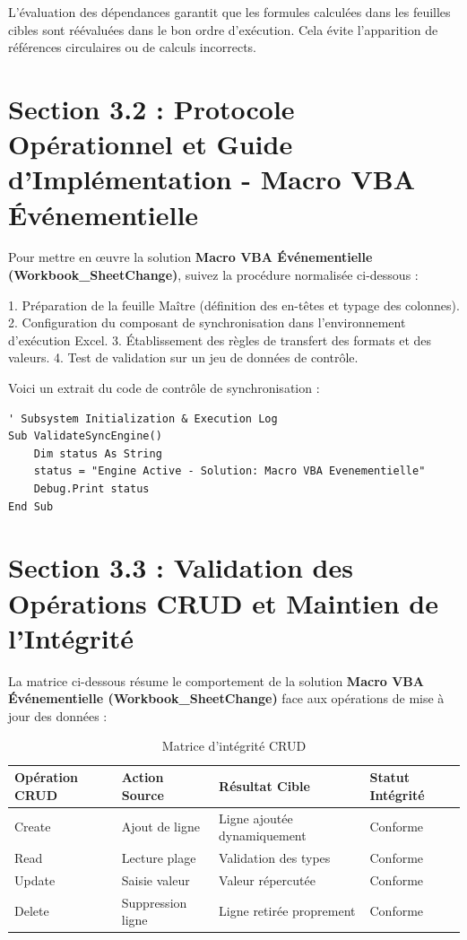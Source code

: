 \documentclass[12pt,a4paper]{report}
\begin{document}
L'évaluation des dépendances garantit que les formules calculées dans les feuilles cibles sont réévaluées dans le bon ordre d'exécution. Cela évite l'apparition de références circulaires ou de calculs incorrects.


\section{Section 3.2 : Protocole Opérationnel et Guide d'Implémentation - Macro VBA Événementielle}
Pour mettre en œuvre la solution \textbf{Macro VBA Événementielle (Workbook\_SheetChange)}, suivez la procédure normalisée ci-dessous :

1. Préparation de la feuille Maître (définition des en-têtes et typage des colonnes).
2. Configuration du composant de synchronisation dans l'environnement d'exécution Excel.
3. Établissement des règles de transfert des formats et des valeurs.
4. Test de validation sur un jeu de données de contrôle.

Voici un extrait du code de contrôle de synchronisation :
\begin{lstlisting}[caption=Code de controle operationnel]
' Subsystem Initialization & Execution Log
Sub ValidateSyncEngine()
    Dim status As String
    status = "Engine Active - Solution: Macro VBA Evenementielle"
    Debug.Print status
End Sub
\end{lstlisting}


\section{Section 3.3 : Validation des Opérations CRUD et Maintien de l'Intégrité}
La matrice ci-dessous résume le comportement de la solution \textbf{Macro VBA Événementielle (Workbook\_SheetChange)} face aux opérations de mise à jour des données :

\begin{table}[h]
\centering
\begin{tabular}{@{}llll@{}}
\toprule
\textbf{Opération CRUD} & \textbf{Action Source} & \textbf{Résultat Cible} & \textbf{Statut Intégrité} \\ \midrule
Create & Ajout de ligne & Ligne ajoutée dynamiquement & Conforme \\
Read & Lecture plage & Validation des types & Conforme \\
Update & Saisie valeur & Valeur répercutée & Conforme \\
Delete & Suppression ligne & Ligne retirée proprement & Conforme \\ \bottomrule
\end{tabular}
\caption{Matrice d'intégrité CRUD}
\end{table}
\end{document}
